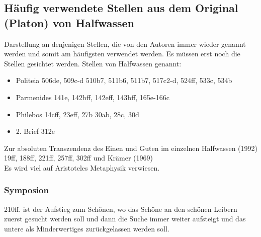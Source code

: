 \documentclass[12pt]{article}
\begin{document}
\subsection{Häufig verwendete Stellen aus dem Original (Platon) von Halfwassen}
Darstellung an denjenigen Stellen, die von den Autoren immer wieder genannt werden und somit am häufigsten verwendet werden. Es müssen erst noch die Stellen gesichtet werden. Stellen von Halfwassen genannt:
\begin{itemize}
    \item {Politeia 506de, 509c-d 510b7, 511b6, 511b7, 517c2-d, 524ff, 533c, 534b}
    \item {Parmenides 141e, 142bff, 142eff, 143bff, 165e-166c}
    \item {Philebos 14cff, 23eff, 27b 30ab, 28c, 30d}
    \item {2. Brief 312e}
\end{itemize}

Zur absoluten Transzendenz des Einen und Guten im einzelnen Halfwassen (1992) 19ff, 188ff, 221ff, 257ff, 302ff und Krämer (1969)\\
Es wird viel auf Aristoteles Metaphysik verwiesen.
\subsubsection*{Symposion}
210ff. ist der Aufstieg zum Schönen, wo das Schöne an den schönen Leibern zuerst gesucht werden soll und dann die Suche immer weiter aufsteigt und das untere als Minderwertiges zurückgelassen werden soll.
\end{document}
